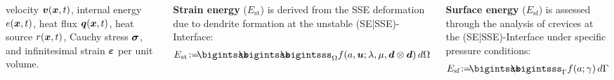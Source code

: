 \documentclass[25pt, a0paper,
portrait,
margin=2mm, 
innermargin=2mm, 
blockverticalspace=7mm, %
colspace=2mm, %
subcolspace=0mm]{tikzposter}
\begin{document}
\begin{columns}
{\begin{minipage}{0.35\textwidth}
\begin{mdframed}
				velocity ${\boldsymbol{\mathnormal v}}({\boldsymbol{\mathnormal x}},t)$,
				internal energy $e({\boldsymbol{\mathnormal x}},t)$, 
				heat flux ${\boldsymbol{\mathnormal q}}({\boldsymbol{\mathnormal x}},t)$,
				heat source $r({\boldsymbol{\mathnormal x}},t)$,
				Cauchy stress ${\boldsymbol{\sigma}}$, and
				infinitesimal strain ${\boldsymbol{\varepsilon}}$
				per unit volume.
				\vspace{-12mm}
			\end{mdframed}
			\begin{minipage}{0.5\textwidth}
				\begin{mdframed}
					\textbf{Strain energy} ($E_{\text{st}}$) is derived from the 
					SSE deformation due to
					dendrite formation 
					at the unstable (SE|SSE)-Interface:
					\begin{align*}
						E_{\text{st}} \! := \!\!\!
						\bigintsss\!\!\!\!\!\!\bigintsss\!\!\!\!\!\!\bigintsss_{\Omega}
						f(a,\bm{u};\lambda,\mu,\bm{d}\otimes\bm{d}) \, d\Omega 
					\end{align*}
				\end{mdframed}
			\end{minipage}
			\hfill 
			\begin{minipage}{0.49\textwidth}
				\begin{mdframed}
					\textbf{Surface energy} ($E_{\text{sf}}$)
					is assessed through the analysis
					of crevices at the (SE|SSE)-Interface
					under specific pressure conditions:
					\begin{align*}
						E_{\text{sf}} \! := \!\!\!
						\bigintsss\!\!\!\!\!\!\bigintsss_{\Gamma} f(a;\gamma) \, d\Gamma
					\end{align*}
				\end{mdframed}
			\end{minipage}

\end{minipage}}
\end{columns}
\end{document}

